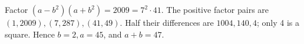 Factor $(a-b^2)(a+b^2)=2009=7^2\cdot41$. The positive factor pairs are $(1,2009),(7,287),(41,49)$. Half their differences are $1004,140,4$; only 4 is a square. Hence $b=2,a=45$, and $\boxed{a+b=47}$.
